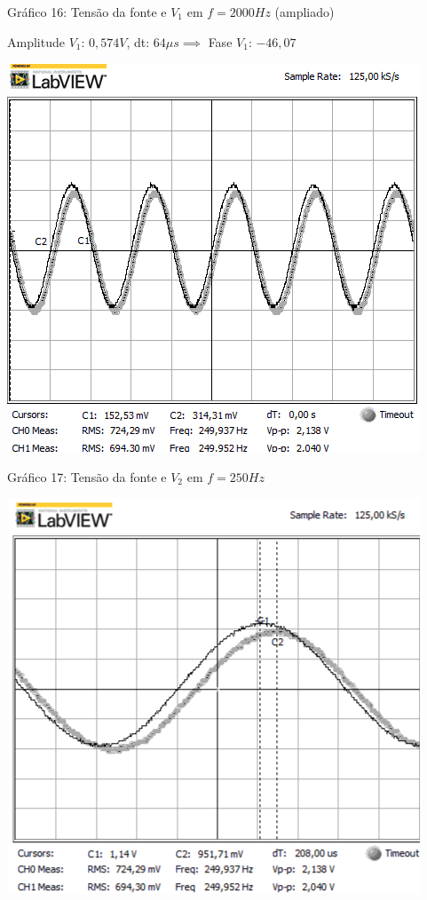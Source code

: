 \begin{center}
Gráfico 16: Tensão da fonte e $V_1$ em $f=2000Hz$ (ampliado)
\end{center}

Amplitude $V_1$: $0,574V$, dt: $64\mu s\implies$ Fase $V_1$: $-46,07$\textdegree

\newpage
\begin{table}[h]
\centering
\includegraphics[scale=0.725]{rgadicoas/rgadicoa5}
\end{table}

\begin{center}
Gráfico 17: Tensão da fonte e $V_2$ em $f=250Hz$ 
\end{center}

\begin{table}[h]
\centering
\includegraphics[scale=0.725]{rgadicoas/rgadicoa5-2}
\end{table}

